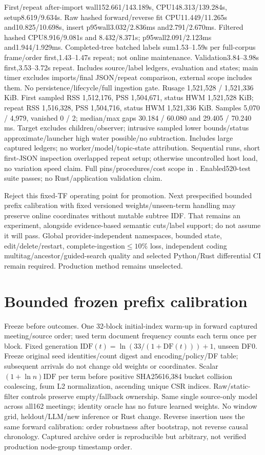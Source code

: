 \documentclass[11pt]{article}
\begin{document}
First/repeat after-import wall152.661/143.189s, CPU148.313/139.284s,
setup8.619/9.634s. Raw hashed forward/reverse fit CPU11.449/11.265s and10.825/10.698s,
insert p95wall3.032/2.836ms and2.791/2.670ms. Filtered hashed CPU8.916/9.081s and
8.432/8.371s; p95wall2.091/2.123ms and1.944/1.929ms. Completed-tree batched labels
sum1.53--1.59s per full-corpus frame/order first,1.43--1.47s repeat; not online
maintenance. Validation3.84--3.98s first,3.53--3.72s repeat. Includes source/label
ledgers, evaluation and states; main timer excludes imports/final JSON/repeat
comparison, external scope includes them. No persistence/lifecycle/full ingestion
gate. Rusage 1,521,528 / 1,521,336 KiB. First sampled RSS 1,512,176,
PSS 1,504,671, status HWM 1,521,528 KiB; repeat RSS 1,516,328, PSS 1,504,716,
status HWM 1,521,336 KiB. Samples 5,070 / 4,979, vanished 0 / 2;
median/max gaps 30.184 / 60.080 and 29.405 / 70.240 ms.
Target excludes children/observer; intrusive sampled lower
bounds/status approximate/launcher high water possible/no subtraction. Includes
large captured ledgers; no worker/model/topic-state attribution. Sequential runs,
short first-JSON inspection overlapped repeat setup; otherwise uncontrolled host
load, no variation speed claim. Full pins/procedures/cost scope in
. Enabled520-test suite passes;
no Rust/application validation claim.

Reject this fixed-TF operating point for promotion. Next prespecified bounded
prefix calibration with fixed versioned weights/unseen-term handling may preserve
online coordinates without mutable subtree IDF. That remains an experiment,
alongside evidence-based semantic cuts/label support; do not assume it will pass.
Global provider-independent namespaces, bounded state, edit/delete/restart,
complete-ingestion$\leq10\%$ loss, independent coding multitag/ancestor/guided-search
quality and selected Python/Rust differential CI remain required. Production
method remains unselected.

\section{Bounded frozen prefix calibration}
Freeze  before outcomes. One
32-block initial-index warm-up in forward captured meeting/source order; used
term document frequency counts each term once per block. Fixed generation
$\mathrm{IDF}(t)=\ln(33/(1+\mathrm{DF}(t)))+1$, unseen DF0. Freeze original seed
identities/count digest and encoding/policy/DF table; subsequent arrivals do not
change old weights or coordinates. Scalar $(1+\ln n)\mathrm{IDF}$ per term before
positive SHA25616,384 bucket collision coalescing, fsum L2 normalization, ascending
unique CSR indices. Raw/static-filter controls preserve empty/fallback ownership.
Same single source-only model across all162 meetings; identity oracle has no
future learned weights. No window grid, heldout/LLM/new inference or Rust change.
Reverse insertion uses the same forward calibration: order robustness after
bootstrap, not reverse causal chronology. Captured archive order is reproducible
but arbitrary, not verified production node-group timestamp order.
\end{document}

